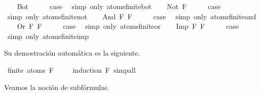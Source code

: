 \begin{isabellebody}
\isamarkupfalse%
\isanewline
\ \ \isamarkupfalse%
\ Bot\isanewline
\ \ \isamarkupfalse%
\ \isamarkupfalse%
\ {\isacharquery}case\ \isamarkupfalse%
\ {\isacharparenleft}simp\ only{\isacharcolon}\ atoms{\isacharunderscore}finite{\isacharunderscore}bot{\isacharparenright}\isanewline
{}\isamarkupfalse%
\isanewline
\ \ \isamarkupfalse%
\ {\isacharparenleft}Not\ F{\isacharparenright}\isanewline
\ \ \isamarkupfalse%
\ \isamarkupfalse%
\ {\isacharquery}case\ \isamarkupfalse%
\ {\isacharparenleft}simp\ only{\isacharcolon}\ atoms{\isacharunderscore}finite{\isacharunderscore}not{\isacharparenright}\isanewline
{}\isamarkupfalse%
\isanewline
\ \ \isamarkupfalse%
\ {\isacharparenleft}And\ F{}\ F{}{\isacharparenright}\isanewline
\ \ \isamarkupfalse%
\ \isamarkupfalse%
\ {\isacharquery}case\ \isamarkupfalse%
\ {\isacharparenleft}simp\ only{\isacharcolon}\ atoms{\isacharunderscore}finite{\isacharunderscore}and{\isacharparenright}\isanewline
{}\isamarkupfalse%
\isanewline
\ \ \isamarkupfalse%
\ {\isacharparenleft}Or\ F{}\ F{}{\isacharparenright}\isanewline
\ \ \isamarkupfalse%
\ \isamarkupfalse%
\ {\isacharquery}case\ \isamarkupfalse%
\ {\isacharparenleft}simp\ only{\isacharcolon}\ atoms{\isacharunderscore}finite{\isacharunderscore}or{\isacharparenright}\isanewline
{}\isamarkupfalse%
\isanewline
\ \ \isamarkupfalse%
\ {\isacharparenleft}Imp\ F{}\ F{}{\isacharparenright}\isanewline
\ \ \isamarkupfalse%
\ \isamarkupfalse%
\ {\isacharquery}case\ \isamarkupfalse%
\ {\isacharparenleft}simp\ only{\isacharcolon}\ atoms{\isacharunderscore}finite{\isacharunderscore}imp{\isacharparenright}\isanewline
{}\isamarkupfalse%
%
\endisatagproof
{\isafoldproof}%
%
\isadelimproof
%
\endisadelimproof
%
\begin{isamarkuptext}%
Su demostración automática es la siguiente.%
\end{isamarkuptext}\isamarkuptrue%
\isamarkupfalse%
\ {\isachardoublequoteopen}finite\ {\isacharparenleft}atoms\ F{\isacharparenright}{\isachardoublequoteclose}\ \isanewline
%
\isadelimproof
\ \ %
\endisadelimproof
%
\isatagproof
{}\isamarkupfalse%
\ {\isacharparenleft}induction\ F{\isacharparenright}\ simp{\isacharunderscore}all%
\endisatagproof
{\isafoldproof}%
%
\isadelimproof
%
\endisadelimproof
%
\isadelimdocument
%
\endisadelimdocument
%
\isatagdocument
%
\isamarkuptrue%
%
\endisatagdocument
{\isafolddocument}%
%
\isadelimdocument
%
\endisadelimdocument
%
\begin{isamarkuptext}%
Veamos la noción de subfórmulas.


\end{isamarkuptext}
\end{isabellebody}
